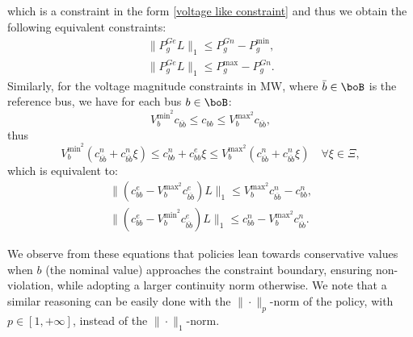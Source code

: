 \documentclass[11pt,a4paper,oneside,openany]{book}
\numberwithin{definition}{section}
\numberwithin{theorem}{section}
\numberwithin{problem}{section}
\begin{document}
which is a constraint in the form \eqref{voltage like constraint} and thus we obtain the following equivalent constraints:
\begin{align}
    \|P_{g}^{Ge}L\|_{1} \leq P_{g}^{Gn}-P_g^{\text{min}}, \\
    \|P_{g}^{Ge}L\|_{1} \leq P_g^{\text{max}}-P_{g}^{Gn}.
\end{align}
Similarly, for the voltage magnitude constraints in MW, where $\bar b \in \boB$ is the reference bus, we have for each bus $b \in \boB$:
\[
V_b^{\text{min}^2}c_{\overline{bb}}  \leq c_{bb}\leq V_b^{\text{max}^2}c_{\overline{bb}},
\]
thus
\[
 V_b^{\text{min}^2}(c_{\overline{bb}}^n + c_{\overline{bb}}^n \xi)\leq c^n_{bb}+c^e_{bb}\xi \leq  V_b^{\text{max}^2}(c_{\overline{bb}}^n + c_{\overline{bb}}^n \xi  ) \quad \forall \xi \in \Xi,
\]
which is equivalent to:
\begin{align}
\|(c^e_{bb}-V_b^{\text{max}^2}c^e_{\overline{bb}})L\|_{1} \leq V_b^{\text{max}^2}c^n_{\overline{bb}} - c^n_{bb}, \\
\|(c^e_{bb}-V_b^{\text{min}^2}c^e_{\overline{bb}})L\|_{1} \leq  c^n_{bb} - V_b^{\text{max}^2}c^n_{\overline{bb}}. 
\end{align}

 We observe from these equations that policies lean towards conservative values when $b$ (the nominal value) approaches the constraint boundary, ensuring non-violation, while adopting a larger continuity norm otherwise. We note that a similar reasoning can be easily done with the $\|\cdot\|_{p}$-norm of the policy, with $p \in [1,+\infty]$, instead of the $\|\cdot\|_{1}$-norm.
\end{document}
